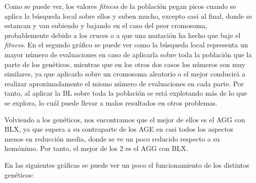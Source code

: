 \documentclass[11pt,a4paper]{article}
\begin{document}
Como se puede ver, los valores \textit{fitness} de la población pegan picos cuando se aplica la búsqueda local sobre ellos y
suben mucho, excepto casi al final, donde se estancan y van subiendo y bajando en el caso del peor cromosoma, probablemente
debido a los cruces o a que una mutación ha hecho que baje el \textit{fitness}. En el segundo gráfico se puede ver como
la búsqueda local representa un mayor número de evaluaciones en caso de aplicarla sobre toda la población que la parte de los
genéticos, mientras que en los otros dos casos los números son muy similares, ya que aplicarlo sobre un cromosoma aleatorio
o el mejor conducirá a realizar aproximadamente el mismo número de evaluaciones en cada parte. Por tanto, al aplicar la BL
sobre toda la población se está explotando más de lo que se explora, lo cuál puede llevar a malos resultados en otros problemas.

Volviendo a los genéticos, nos encontramos que el mejor de ellos es el AGG con BLX, ya que supera a su contraparte de los AGE
en casi todos los aspectos menos en reducción media, donde se ve un poco reducido respecto a su homónimo. Por tanto, el mejor
de los 2 es el AGG con BLX.

En las siguientes gráficas se puede ver un poco el funcionamiento de los distintos genéticos:
\end{document}
